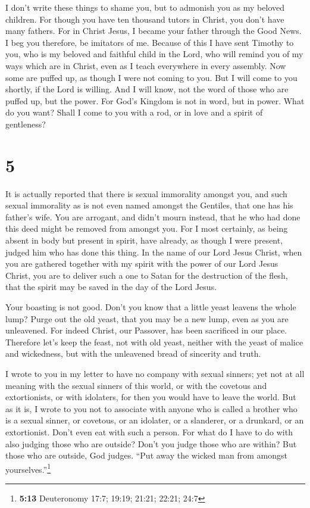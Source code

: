  I don't write these things to shame you, but to admonish
you as my beloved children.  For though you have ten
thousand tutors in Christ, you don't have many fathers. For in Christ
Jesus, I became your father through the Good News.  I beg
you therefore, be imitators of me.  Because of this I
have sent Timothy to you, who is my beloved and faithful child in the
Lord, who will remind you of my ways which are in Christ, even as I
teach everywhere in every assembly.  Now some are puffed
up, as though I were not coming to you.  But I will come
to you shortly, if the Lord is willing. And I will know, not the word of
those who are puffed up, but the power.  For God's
Kingdom is not in word, but in power.  What do you want?
Shall I come to you with a rod, or in love and a spirit of gentleness?

\hypertarget{section-4}{%
\section{5}\label{section-4}}

 It is actually reported that there is sexual immorality
amongst you, and such sexual immorality as is not even named amongst the
Gentiles, that one has his father's wife.  You are
arrogant, and didn't mourn instead, that he who had done this deed might
be removed from amongst you.  For I most certainly, as
being absent in body but present in spirit, have already, as though I
were present, judged him who has done this thing.  In the
name of our Lord Jesus Christ, when you are gathered together with my
spirit with the power of our Lord Jesus Christ,  you are
to deliver such a one to Satan for the destruction of the flesh, that
the spirit may be saved in the day of the Lord Jesus.

 Your boasting is not good. Don't you know that a little
yeast leavens the whole lump?  Purge out the old yeast,
that you may be a new lump, even as you are unleavened. For indeed
Christ, our Passover, has been sacrificed in our place. 
Therefore let's keep the feast, not with old yeast, neither with the
yeast of malice and wickedness, but with the unleavened bread of
sincerity and truth.

 I wrote to you in my letter to have no company with
sexual sinners;  yet not at all meaning with the sexual
sinners of this world, or with the covetous and extortionists, or with
idolaters, for then you would have to leave the world. 
But as it is, I wrote to you not to associate with anyone who is called
a brother who is a sexual sinner, or covetous, or an idolater, or a
slanderer, or a drunkard, or an extortionist. Don't even eat with such a
person.  For what do I have to do with also judging those
who are outside? Don't you judge those who are within? 
But those who are outside, God judges. ``Put away the wicked man from
amongst yourselves.''\footnote{\textbf{5:13} Deuteronomy 17:7; 19:19;
  21:21; 22:21; 24:7}

